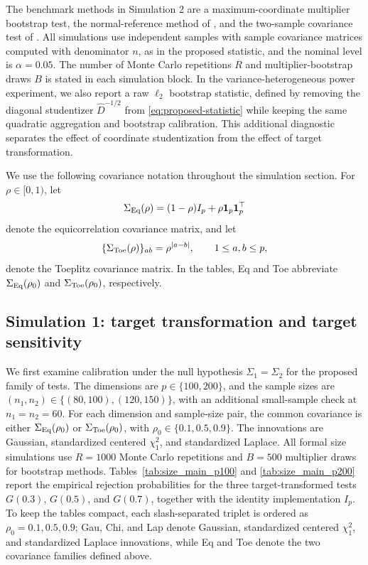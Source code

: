 \documentclass[
  12pt]{article}
\theoremstyle{plain}
\theoremstyle{definition}
\theoremstyle{remark}
\begin{document}
The benchmark methods in Simulation 2 are a maximum-coordinate multiplier
bootstrap test, the normal-reference method of \citet{wang_two-sample_2024},
and the two-sample covariance test of \citet{li_two_2012}.  All simulations use
independent samples with sample covariance matrices computed with denominator
\(n\), as in the proposed statistic, and the nominal level is
\(\alpha=0.05\).  The number of Monte Carlo repetitions \(R\) and
multiplier-bootstrap draws \(B\) is stated in each simulation block.  In the
variance-heterogeneous power experiment, we also report a raw \(\ell_2\)
bootstrap statistic, defined by removing the diagonal studentizer
\(\widehat D^{-1/2}\) from \eqref{eq:proposed-statistic} while keeping the same
quadratic aggregation and bootstrap calibration.  This additional diagnostic
separates the effect of coordinate studentization from the effect of target
transformation.

We use the following covariance notation throughout the simulation section.
For \(\rho\in[0,1)\), let
\[
\Sigma_{\rm Eq}(\rho)=(1-\rho)I_p+\rho{\bf 1}_p{\bf 1}_p^\top
\]
denote the equicorrelation covariance matrix, and let
\[
\{\Sigma_{\rm Toe}(\rho)\}_{ab}=\rho^{|a-b|},\qquad 1\le a,b\le p,
\]
denote the Toeplitz covariance matrix.  In the tables, Eq and Toe abbreviate
\(\Sigma_{\rm Eq}(\rho_0)\) and \(\Sigma_{\rm Toe}(\rho_0)\), respectively.

\subsection{Simulation 1: target transformation and target sensitivity}
\label{sec:simulation_target}

We first examine calibration under the null hypothesis \(\Sigma_1=\Sigma_2\)
for the proposed family of tests.  The dimensions are \(p\in\{100,200\}\), and
the sample sizes are
\((n_1,n_2)\in\{(80,100),(120,150)\}\), with an additional small-sample check
at \(n_1=n_2=60\).  For each dimension and sample-size pair, the common
covariance is either \(\Sigma_{\rm Eq}(\rho_0)\) or
\(\Sigma_{\rm Toe}(\rho_0)\), with
\(\rho_0\in\{0.1,0.5,0.9\}\).  The innovations are Gaussian, standardized
centered \(\chi^2_1\), and standardized Laplace.  All formal size simulations
use \(R=1000\) Monte Carlo repetitions and \(B=500\) multiplier draws for
bootstrap methods.  Tables~\ref{tab:size_main_p100} and
\ref{tab:size_main_p200} report the empirical rejection probabilities for the
three target-transformed tests \(G(0.3)\), \(G(0.5)\), and \(G(0.7)\), together
with the identity implementation \(I_p\).  To keep the tables compact, each
slash-separated triplet is ordered as
\(\rho_0=0.1,0.5,0.9\); Gau, Chi, and Lap denote Gaussian, standardized
centered \(\chi^2_1\), and standardized Laplace innovations, while Eq and Toe
denote the two covariance families defined above.
\end{document}
